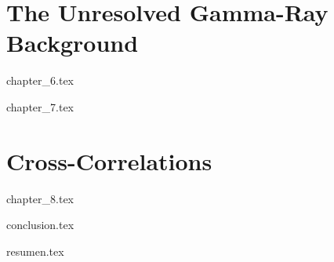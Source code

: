 \documentclass[a4paper,11pt,twoside,oldfontcommands]{memoir}
\begin{document}
\part{The Unresolved Gamma-Ray Background}

{chapter_6.tex}
\clearemptydoublepage

{chapter_7.tex}
\clearemptydoublepage

\part{Cross-Correlations}

{chapter_8.tex}
\clearemptydoublepage

\thumbfalse   %
{conclusion.tex}
\clearemptydoublepage



\printglossary
\renewcommand*{\arraystretch}{0.5}
\printglossary[title=List of Acronyms,
               toctitle=List of Acronyms,
               type=\acronymtype,
               nonumberlist]




{resumen.tex}
\end{document}
